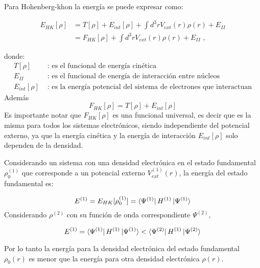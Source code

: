 \noindent Para Hohenberg-khon la energ\'ia se puede expresar como:

\begin{equation}
\begin{split}
E_{HK}[\rho] &= T[\rho] + E_{int}[\rho] + \int d^{3}rV_{ext}(r)\rho (r) + 
E_{II} \\
&= F_{HK}[\rho] + \int d^{3}r V_{ext}(r)\rho (r) + E_{II} \textrm{ ,}
\end{split}
\end{equation}

\noindent donde:
\[
\begin{split}
T[\rho] & \text{  : es el funcional de energ\'ia cin\'etica} \\
E_{II}  & \text{  : es el funcional de energ\'ia de interacci\'on entre 
    n\'ucleos} \\
E_{int}[\rho] & \text{  : es la energ\'ia potencial del sistema de 
    electrones que interactuan}
\end{split}
\]
\noindent Adem\'as
\begin{equation}
F_{HK}[\rho] = T[\rho] + E_{int}[\rho] \label{F_HK}
\end{equation}
\noindent Es importante notar que $F_{HK}[\rho]$ es una funcional universal, es 
decir 
que es la misma para todos los sistemas electr\'onicos, siendo independiente
del potencial externo, ya que la energ\'ia cin\'etica y la energ\'ia de
interacci\'on $E_{int}[\rho]$ solo dependen de la densidad.


\noindent Considerando un sistema con una densidad electr\'onica en el estado 
fundamental
$\rho_{0}^{(1)}$ que corresponde a un potencial externo $V_{ext}^{(1)}(r)$,
la energ\'ia del estado fundamental es:

\begin{equation}
E^{(1)} = E_{HK}[\rho _{0}^{(1)}] = \bra{\Psi ^{(1)}} H^{(1)} \ket{\Psi 
    ^{(1)}}
\end{equation}
\noindent Considerando $\rho ^{(2)}$ con su funci\'on de onda correspondiente
$\Psi ^{(2)}$,

\begin{equation}
E^{(1)} = \bra{\Psi ^{(1)}} H^{(1)} \ket{\Psi ^{(1)}} < \bra{\Psi ^{(2)}} 
H^{(1)} \ket{\Psi ^{(2)}}
\end{equation}

\noindent Por lo tanto la energ\'ia para la densidad electr\'onica del estado 
fundamental 
$\rho_{0}(r)$ es menor que la energ\'ia para otra densidad electr\'onica 
$\rho (r)$.
